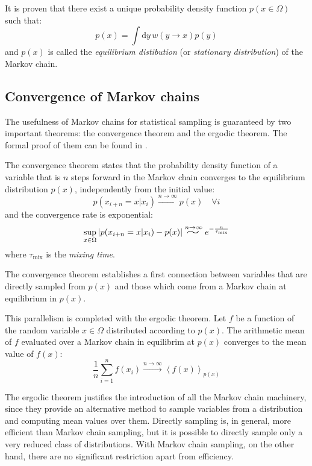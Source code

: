 It is proven \cite{mc-mt} that there exist a unique probability density function $p(x\in\Omega)$
such that:
\begin{equation}\label{eq:equilibrium}
	p(x) = \int\mathrm dy\,w(y \to x)p(y)
\end{equation}
and $p(x)$ is called the \emph{equilibrium distibution} (or \emph{stationary distribution}) of the Markov chain.

\subsection*{Convergence of Markov chains}
The usefulness of Markov chains for statistical sampling is guaranteed by two important theorems:
the convergence theorem and the ergodic theorem. The formal proof of them can be found in \cite{mc-mt}.

The convergence theorem states that the probability density function of a variable that is $n$ steps forward in the Markov chain
converges to the equilibrium distribution $p(x)$, independently from the initial value:
\begin{equation}\label{eq:convergence}
    p(x_{i+n}=x|x_i) \xrightarrow{n\to\infty} p(x) \quad \forall i
\end{equation}
and the convergence rate is exponential:
\begin{equation}\label{eq:convergence_rate}
	\sup_{x\in\Omega} |p(x_{i+n}=x|x_i) - p(x)| \stackrel{n\to\infty}{\scalebox{2}[1.25]{$\sim$}} e^{-\frac{n}{\tau_\mathrm{mix}}}
\end{equation}
where $\tau_\mathrm{mix}$ is the \emph{mixing time}.

The convergence theorem establishes a first connection between variables that are directly sampled from $p(x)$
and those which come from a Markov chain at equilibrium in $p(x)$.

This parallelism is completed with the ergodic theorem.
Let $f$ be a function of the random variable $x\in\Omega$ distributed according to $p(x)$.
The arithmetic mean of $f$ evaluated over a Markov chain in equilibrim at $p(x)$ converges to the mean value of $f(x)$:
\begin{equation*}
    \frac{1}{n}\sum_{i=1}^n f(x_i) \xrightarrow{n\to\infty} \left<f(x)\right>_{p(x)}
\end{equation*}

The ergodic theorem justifies the introduction of all the Markov chain machinery,
since they provide an alternative method to sample variables from a distribution and computing mean values over them.
Directly sampling is, in general, more efficient than Markov chain sampling,
but it is possible to directly sample only a very reduced class of distributions.
With Markov chain sampling, on the other hand, there are no significant restriction apart from efficiency.

